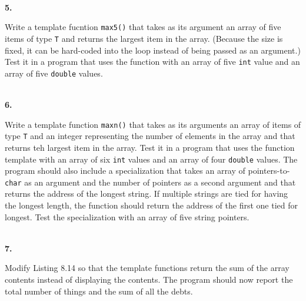 \documentclass[10 pt]{amsart}
\newlength{\cwidth}
\newenvironment{cpart}[2][\cwidth]
	{\\ \phantom{\qquad}\textbf{#2. }\begin{minipage}[t]{#1}}
	{\end{minipage}}
\newcommand{\ttt}[1]{\texttt{#1}}
\begin{document}
	\begin{cpart}{5}
		Write a template fucntion \ttt{max5()} that takes as its
		argument an array of five items of type \ttt{T} and
		returns the largest item in the array.
		(Because the size is fixed, it can be hard-coded into the loop
		instead of being passed as an argument.)
		Test it in a program that uses the function with an array
		of five \ttt{int} value and an array of five \ttt{double}
		values.
	\end{cpart}
	\vspace{2ex}

	\begin{cpart}{6}
		Write a template function \ttt{maxn()} that takes as its 
		arguments an array of items of type \ttt{T} and an 
		integer representing the number of elements in the array and
		that returns teh largest item in the array.
		Test it in a program that uses the function template with
		an array of six \ttt{int} values and an array of four
		\ttt{double} values.
		The program should also include a specialization that takes
		an array of pointers-to-\ttt{char} as an argument and the
		number of pointers as a second argument and that returns
		the address of the longest string.
		If multiple strings are tied for having the longest length,
		the function should return the address of the first one tied
		for longest.
		Test the specialization with an array of five string pointers.
	\end{cpart}
	\vspace{2ex}

	\begin{cpart}{7}
		Modify Listing 8.14 so that the template functions return
		the sum of the array contents instead of displaying the 
		contents.
		The program should now report the total number of things
		and the sum of all the debts.
	\end{cpart}
	\vspace{2ex}
\end{document}
